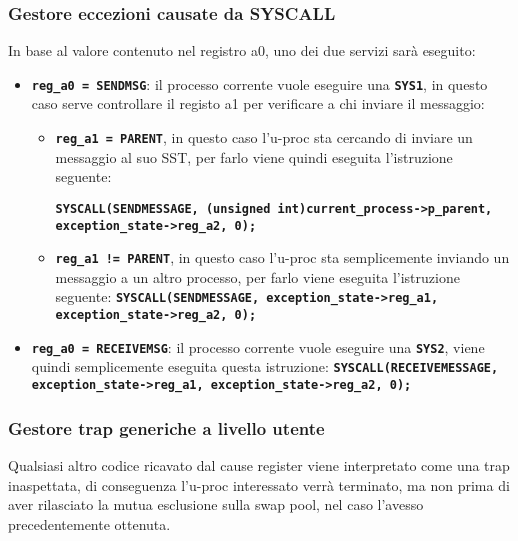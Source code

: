 \documentclass{article}
\begin{document}
	\subsubsection{Gestore eccezioni causate da SYSCALL}
	In base al valore contenuto nel registro a0, uno dei due servizi sarà eseguito:
	\begin{itemize}
		\item \texttt{\textbf{reg\_a0 = SENDMSG}}: il processo corrente vuole eseguire
			una \texttt{\textbf{SYS1}}, in questo caso serve controllare il registo a1
			per verificare a chi inviare il messaggio:
			\begin{itemize}
				\item \texttt{\textbf{reg\_a1 = PARENT}}, in questo caso l'u-proc sta cercando
					di inviare un messaggio al suo SST, per farlo viene quindi eseguita l'istruzione
					seguente:

					\texttt{\textbf{SYSCALL(SENDMESSAGE, (unsigned int)current\_process->p\_parent,
					\newline
					exception\_state->reg\_a2, 0);}}

				\item \texttt{\textbf{reg\_a1 != PARENT}}, in questo caso l'u-proc sta semplicemente
					inviando un messaggio a un altro processo, per farlo viene eseguita l'istruzione
					seguente:
					\newline
					\texttt{\textbf{SYSCALL(SENDMESSAGE, exception\_state->reg\_a1,
					\newline
					exception\_state->reg\_a2, 0);}}
			\end{itemize}

		\item \texttt{\textbf{reg\_a0 = RECEIVEMSG}}: il processo corrente vuole eseguire
			una \texttt{\textbf{SYS2}}, viene quindi semplicemente eseguita questa istruzione:
			\newline
			\texttt{\textbf{SYSCALL(RECEIVEMESSAGE, exception\_state->reg\_a1, exception\_state->reg\_a2,
			0);}}
	\end{itemize}
	\subsubsection{Gestore trap generiche a livello utente}
	Qualsiasi altro codice ricavato dal cause register viene interpretato come una
	trap inaspettata, di conseguenza l'u-proc interessato verrà terminato, ma non prima
	di aver rilasciato la mutua esclusione sulla swap pool, nel caso l'avesso
	precedentemente ottenuta.
\end{document}
